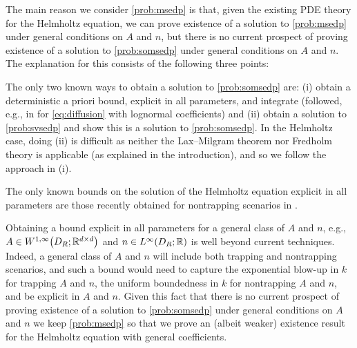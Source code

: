 The main reason we consider \cref{prob:msedp} is that, given the existing PDE theory for the Helmholtz equation, we can prove existence of a solution to \cref{prob:msedp} under general conditions on $A$ and $n$, but there is no current prospect of proving existence of a solution to \cref{prob:somsedp} under general conditions on $A$ and $n$. The explanation for this consists of the following three points:
\ben
\item The only two known ways to obtain a solution to \cref{prob:somsedp} are: (i) obtain a deterministic a priori bound, explicit in all parameters, and integrate (followed, e.g., in \cite{ChScTe:13} for \eqref{eq:diffusion} with lognormal coefficients) and (ii) obtain a solution to \cref{prob:svsedp} and show this is a solution to \cref{prob:somsedp}. In the Helmholtz case, doing (ii) is difficult as neither the Lax--Milgram theorem nor Fredholm theory is applicable (as explained in the introduction), and so we follow the approach in (i).
\item The only known bounds on the solution of the Helmholtz equation explicit in all parameters are those recently obtained for nontrapping scenarios in \cite{GrPeSp:19,GaSpWu:18}.
\item Obtaining a bound explicit in all parameters for a general class of $A$ and $n$, e.g., $A \in \WoiDRRRdtd$ and $n \in \LiDRRR$ is well beyond current techniques. Indeed, a general class of $A$ and $n$ will include both trapping and nontrapping scenarios, and such a bound would need to capture the exponential blow-up in $k$ for trapping $A$ and $n$, the uniform boundedness in $k$ for nontrapping $A$ and $n$, and be explicit in $A$ and $n$.
\een
Given this fact that there is no current prospect of proving existence of a solution to \cref{prob:somsedp} under general conditions on $A$ and $n$ we keep \cref{prob:msedp} so that we prove an (albeit weaker) existence result for the Helmholtz equation with general coefficients.


